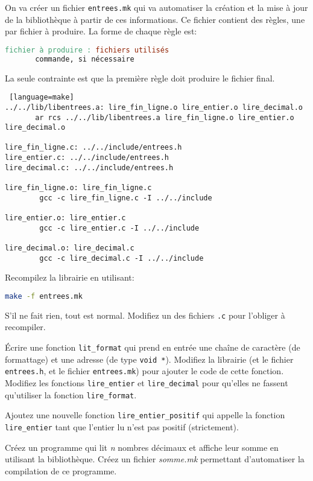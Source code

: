 \question On va créer un fichier \texttt{entrees.mk} qui va
automatiser la création et la mise à jour de la bibliothèque à partir
de ces informations. Ce fichier contient des règles, une par fichier à
produire. La forme de chaque règle est:
\begin{lstlisting}[language=make]
fichier à produire : fichiers utilisés
       commande, si nécessaire
\end{lstlisting}
La seule contrainte est que la première règle doit produire le fichier final.

\begin{solutioncachee}
  \begin{lstlisting} [language=make]
../../lib/libentrees.a: lire_fin_ligne.o lire_entier.o lire_decimal.o
       ar rcs ../../lib/libentrees.a lire_fin_ligne.o lire_entier.o lire_decimal.o

lire_fin_ligne.c: ../../include/entrees.h   
lire_entier.c: ../../include/entrees.h   
lire_decimal.c: ../../include/entrees.h

lire_fin_ligne.o: lire_fin_ligne.c
        gcc -c lire_fin_ligne.c -I ../../include

lire_entier.o: lire_entier.c
        gcc -c lire_entier.c -I ../../include

lire_decimal.o: lire_decimal.c
        gcc -c lire_decimal.c -I ../../include
  \end{lstlisting}
\end{solutioncachee}

\question Recompilez la librairie en utilisant:
\begin{lstlisting}[language=bash]
  make -f entrees.mk
\end{lstlisting}

\begin{solutioncachee}
  S'il ne fait rien, tout est normal. Modifiez un des fichiers
  \texttt{.c} pour l'obliger à recompiler.
\end{solutioncachee}

\question Écrire une fonction \texttt{lit\_format} qui prend en entrée
une chaîne de caractère (de formattage) et une adresse (de type
\texttt{void *}). Modifiez la librairie (et le fichier
\texttt{entrees.h}, et le fichier \texttt{entrees.mk}) pour ajouter le
code de cette fonction. Modifiez les fonctions \texttt{lire\_entier}
et \texttt{lire\_decimal} pour qu'elles ne fassent qu'utiliser la
fonction \texttt{lire\_format}.

\question Ajoutez une nouvelle fonction \texttt{lire\_entier\_positif}
qui appelle la fonction \texttt{lire\_entier} tant que l'entier lu
n'est pas positif (strictement).

\question Créez un programme qui lit \emph{n} nombres décimaux et
affiche leur somme en utilisant la bibliothèque. Créez un fichier
\emph{somme.mk} permettant d'automatiser la compilation de ce
programme.
